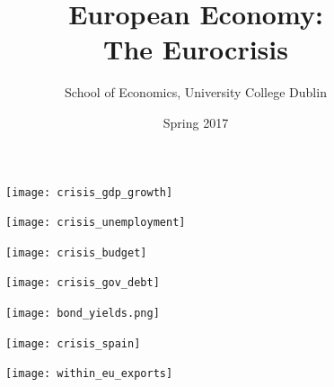 \documentclass{beamer}
\title{European Economy:\\ The Eurocrisis}
\author{School of Economics, University College Dublin}
\date{Spring 2017}
\begin{document}
\begin{frame}
\titlepage  
\end{frame}

\begin{frame}
  \begin{figure}
    \texttt{[image: crisis\_gdp\_growth]}
  \end{figure}
\end{frame}


\begin{frame}
  \begin{figure}
    \texttt{[image: crisis\_unemployment]}
  \end{figure}
\end{frame}

\begin{frame}
  \begin{figure}
    \texttt{[image: crisis\_budget]}
  \end{figure}
\end{frame}

\begin{frame}
  \begin{figure}
    \texttt{[image: crisis\_gov\_debt]}
  \end{figure}
\end{frame}

\begin{frame}
  \begin{figure}
    \texttt{[image: bond\_yields.png]}
  \end{figure}
\end{frame}


\begin{frame}
  \begin{figure}
    \texttt{[image: crisis\_spain]}
  \end{figure}
\end{frame}

\begin{frame}
  \begin{figure}
    \texttt{[image: within\_eu\_exports]}
  \end{figure}
\end{frame}
\end{document}
